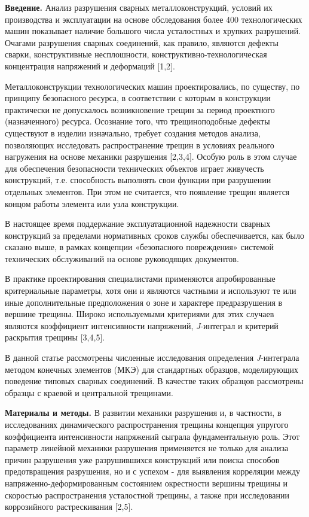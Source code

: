 \begin{multicols}{2}
{\bfseries Введение.} Анализ разрушения сварных металлоконструкций, условий
их производства и эксплуатации на основе обследования более 400
технологических машин показывает наличие большого числа усталостных и
хрупких разрушений. Очагами разрушения сварных соединений, как правило,
являются дефекты сварки, конструктивные несплошности,
конструктивно-технологическая концентрация напряжений и деформаций
{[}1,2{]}.

Металлоконструкции технологических машин проектировались, по существу,
по принципу безопасного ресурса, в соответствии с которым в конструкции
практически не допускалось возникновение трещин за период проектного
(назначенного) ресурса. Осознание того, что трещиноподобные дефекты
существуют в изделии изначально, требует создания методов анализа,
позволяющих исследовать распространение трещин в условиях реального
нагружения на основе механики разрушения {[}2,3,4{]}. Особую роль в этом
случае для обеспечения безопасности технических объектов играет
живучесть конструкций, т.е. способность выполнять свои функции при
разрушении отдельных элементов. При этом не считается, что появление
трещин является концом работы элемента или узла конструкции.

В настоящее время поддержание эксплуатационной надежности сварных
конструкций за пределами нормативных сроков службы обеспечивается, как
было сказано выше, в рамках концепции «безопасного повреждения» системой
технических обслуживаний на основе руководящих документов.

В практике проектирования специалистами применяются апробированные
критериальные параметры, хотя они и являются частными и используют те
или иные дополнительные предположения о зоне и характере предразрушения
в вершине трещины. Широко используемыми критериями для этих случаев
являются коэффициент интенсивности напряжений, \emph{J}-интеграл и
критерий раскрытия трещины {[}3,4,5{]}.

В данной статье рассмотрены численные исследования определения
\emph{J}-интеграла методом конечных элементов (МКЭ) для стандартных
образцов, моделирующих поведение типовых сварных соединений. В качестве
таких образцов рассмотрены образцы с краевой и центральной трещинами.

{\bfseries Материалы и методы.} В развитии механики разрушения и, в
частности, в исследованиях динамического распространения трещины
концепция упругого коэффициента интенсивности напряжений сыграла
фундаментальную роль. Этот параметр линейной механики разрушения
применяется не только для анализа причин разрушения уже разрушившихся
конструкций или поиска способов предотвращения разрушения, но и с
успехом - для выявления корреляции между напряженно-деформированным
состоянием окрестности вершины трещины и скоростью распространения
усталостной трещины, а также при исследовании коррозийного
растрескивания {[}2,5{]}.


\end{multicols}
